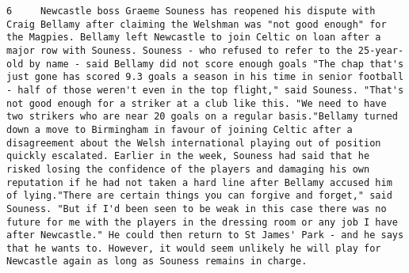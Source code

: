 \documentclass[11pt]{article}
\begin{document}
\begin{Verbatim}[commandchars=\\\{\}]
         6     Newcastle boss Graeme Souness has reopened his dispute with Craig Bellamy after claiming the Welshman was "not good enough" for the Magpies. Bellamy left Newcastle to join Celtic on loan after a major row with Souness. Souness - who refused to refer to the 25-year-old by name - said Bellamy did not score enough goals "The chap that's just gone has scored 9.3 goals a season in his time in senior football - half of those weren't even in the top flight," said Souness. "That's not good enough for a striker at a club like this. "We need to have two strikers who are near 20 goals on a regular basis."Bellamy turned down a move to Birmingham in favour of joining Celtic after a disagreement about the Welsh international playing out of position quickly escalated. Earlier in the week, Souness had said that he risked losing the confidence of the players and damaging his own reputation if he had not taken a hard line after Bellamy accused him of lying."There are certain things you can forgive and forget," said Souness. "But if I'd been seen to be weak in this case there was no future for me with the players in the dressing room or any job I have after Newcastle." He could then return to St James' Park - and he says that he wants to. However, it would seem unlikely he will play for Newcastle again as long as Souness remains in charge.                                                                                                                                                                                                                                                                                                                                                                                                                                                                                                                                                                                                                                                                                                                                                                                                                                                                                                                                                                                                                                                                                                                                                                                                                                                                                                                                                                                                                                                                                                                                                                                                                                                                                                                                                                                                                                                                                                                                                                                                                     
\end{Verbatim}
\end{document}
